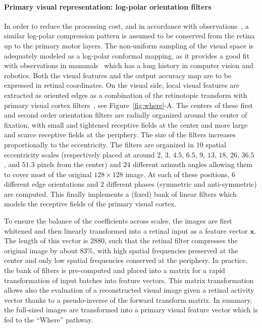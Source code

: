 \paragraph{Primary visual representation: log-polar orientation filters}
In order to reduce the processing cost, and in accordance with observations~\cite{connolly1984representation,sparks1987sensory}, a similar log-polar compression pattern is assumed to be conserved from the retina up to the primary motor layers.
The non-uniform sampling of the visual space is adequately modeled as a log-polar conformal mapping, as it provides a good fit with observations in mammals~\cite{Traver10} which has a long history in computer vision and robotics.
Both the visual features and the output accuracy map are to be expressed in retinal coordinates.
On the visual side, local visual features are extracted as oriented edges as a combination of the retinotopic transform with primary visual cortex filters~\cite{Fischer2007a}, see Figure~\ref{fig:where}-A. The centers of these first and second order orientation filters are radially organized around the center of fixation, with small and tightened receptive fields at the center and more large and scarce receptive fields at the periphery.
The size of the filters increases proportionally to the eccentricity.  The filters are organized in $10$ spatial eccentricity scales (respectively placed at around $2$, $3$, $4.5$, $6.5$, $9$, $13$, $18$, $26$, $36.5$ , and $51.3$ pixels from the center) and $24$ different azimuth angles allowing them to cover most of the original $128 \times 128 $ image. At each of these positions, $6$ different edge orientations and $2$ different phases (symmetric and anti-symmetric) are computed. This finally implements a (fixed) bank of linear filters which models the receptive fields of the primary visual cortex.

To ensure the balance of the coefficients across scales, the images are first whitened and then linearly transformed into a retinal input as a feature vector $\boldsymbol{x}$.  The length of this vector is $2880$, such that the retinal filter compresses the original image by about $83\%$, with high spatial frequencies preserved at the center and only low spatial frequencies conserved at the periphery. In practice, the bank of filters is pre-computed and placed into a matrix for a rapid transformation of input batches into feature vectors. This matrix transformation allows also the evaluation of a reconstructed visual image given a retinal activity vector thanks to a pseudo-inverse of the forward transform matrix. In summary, the full-sized images are transformed into a primary visual feature vector which is fed to the ``Where'' pathway.

